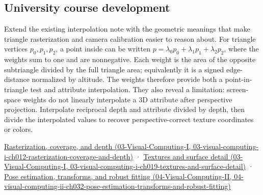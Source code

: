 \subsection{University course development}\label{appendix-02b9d9a81dca-university-course-development}

Extend the existing interpolation note with the geometric meanings that make triangle rasterization and camera calibration easier to reason about. For triangle vertices \(p_0,p_1,p_2\), a point inside can be written \(p=\lambda_0p_0+\lambda_1p_1+\lambda_2p_2\), where the weights sum to one and are nonnegative. Each weight is the area of the opposite subtriangle divided by the full triangle area; equivalently it is a signed edge-distance normalized by altitude. The weights therefore provide both a point-in-triangle test and attribute interpolation. They also reveal a limitation: screen-space weights do not linearly interpolate a 3D attribute after perspective projection. Interpolate reciprocal depth and attribute divided by depth, then divide the interpolated values to recover perspective-correct texture coordinates or colors.

\href{../03-Visual-Computing-I/main.pdf\#nameddest=03-visual-computing-i-ch012-rasterization-coverage-and-depth}{Rasterization, coverage, and depth (03-Visual-Computing-I, 03-visual-computing-i-ch012-rasterization-coverage-and-depth)} · \href{../03-Visual-Computing-I/main.pdf\#nameddest=03-visual-computing-i-ch019-textures-and-surface-detail}{Textures and surface detail (03-Visual-Computing-I, 03-visual-computing-i-ch019-textures-and-surface-detail)} · \href{../04-Visual-Computing-II/main.pdf\#nameddest=04-visual-computing-ii-ch032-pose-estimation-transforms-and-robust-fitting}{Pose estimation, transforms, and robust fitting (04-Visual-Computing-II, 04-visual-computing-ii-ch032-pose-estimation-transforms-and-robust-fitting)}

